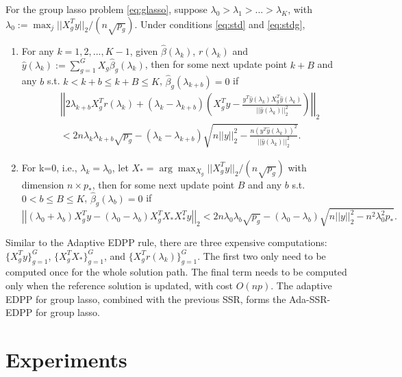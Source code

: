\begin{theorem}
  For the group lasso problem \eqref{eq:glasso}, suppose $\lambda_0>\lambda_1>...>\lambda_K$, with $\lambda_0:= \max_j ||X_g^Ty||_2 / (n\sqrt{p_g})$. Under conditions \eqref{eq:std} and \eqref{eq:stdg},
    \begin{enumerate}
        \item For any $k=1,2,...,K-1$, given $\hat{\beta}(\lambda_k)$, $r(\lambda_k)$ and $\hat{y}(\lambda_k):=\sum_{g=1}^GX_g\hat{\beta}_g(\lambda_k)$, then for some next update point $k+B$ and any $b$ s.t. $k<k+b\leq k+B\leq K$, $\hat{\beta}_g(\lambda_{k+b})=0$ if
        \begin{equation}
            \begin{split}
                &\left|\left|2\lambda_{k+b}X_g^Tr(\lambda_k)+(\lambda_k-\lambda_{k+b})\left( X_g^Ty-\frac{y^T\hat{y}(\lambda_k)X_g^T\hat{y}(\lambda_k)}{||\hat{y}(\lambda_k)||_2^2}\right)\right|\right|_2\\
                &<2n\lambda_k\lambda_{k+b}\sqrt{p_g}-(\lambda_k-\lambda_{k+b})\sqrt{n||y||_2^2-\frac{n(y^T\hat{y}(\lambda_k))^2}{||\hat{y}(\lambda_k)||_2^2}}.
            \end{split}
        \end{equation}
        \item For k=0, i.e., $\lambda_k=\lambda_0$, let $X_*=\arg \max_{X_g} ||X_g^Ty||_2 / (n\sqrt{p_g})$ with dimension $n\times p_*$, then for some next update point $B$ and any $b$ s.t. $0<b\leq B\leq K$, $\hat{\beta}_g(\lambda_{b})=0$ if
        \begin{equation}
        \left|\left|(\lambda_0+\lambda_b)X_g^Ty-(\lambda_0-\lambda_b)X_g^TX_*X_*^Ty\right|\right|_2<2n\lambda_0\lambda_b\sqrt{p_g}-(\lambda_0-\lambda_b)\sqrt{n||y||_2^2-n^2\lambda_0^2p_*}.
    \end{equation}
    \end{enumerate}
\end{theorem}

Similar to the Adaptive EDPP rule, there are three expensive computations: $\{X_g^Ty\}_{g=1}^G$, $\{X_g^TX_*\}_{g=1}^G$, and $\{X_g^Tr(\lambda_k)\}_{g=1}^G$. The first two only need to be computed once for the whole solution path. The final term needs to be computed only when the reference solution is updated, with cost $O(np)$. The adaptive EDPP for group lasso, combined with the previous SSR, forms the Ada-SSR-EDPP for group lasso.

\section{Experiments}
\label{sec:experiments}

